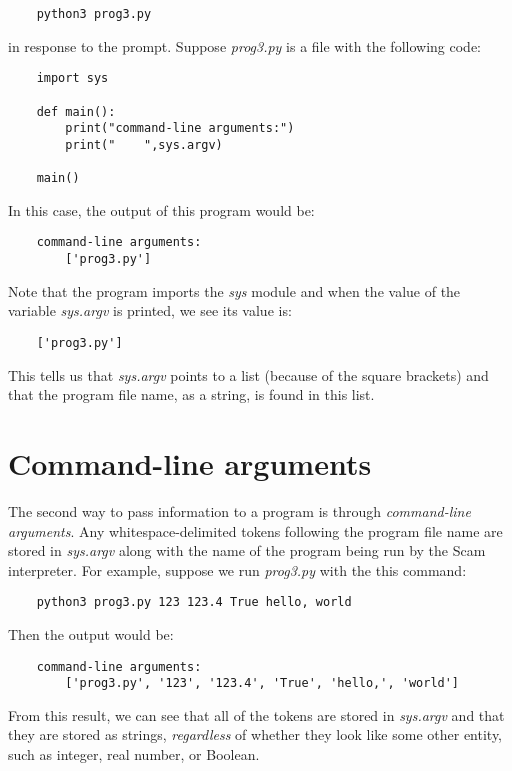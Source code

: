 \begin{verbatim}
    python3 prog3.py
\end{verbatim}

in response to the prompt. Suppose {\it prog3.py} is a file
with the following code:

\begin{verbatim}
    import sys

    def main():
        print("command-line arguments:")
        print("    ",sys.argv)

    main()
\end{verbatim}

In this case, the output of this program would be:

\begin{verbatim}
    command-line arguments:
        ['prog3.py']
\end{verbatim}

Note that the program imports the {\it sys} module and when
the value of the variable {\it sys.argv} is printed, we
see its value is:

\begin{verbatim}
    ['prog3.py']
\end{verbatim}

This tells us that {\it sys.argv} points to a list (because of the
square brackets) and that the program file name, as a string,
is found in this list.

\section*{Command-line arguments}

The second way to pass information to a program is
through {\it command-line arguments}.
Any whitespace-delimited tokens following
the program file name are stored in {\it sys.argv} 
along with the name of the program being run
by the Scam interpreter.
For example, suppose we run {\it prog3.py} with the this
command:

\begin{verbatim}
    python3 prog3.py 123 123.4 True hello, world
\end{verbatim}

Then the output would be:

\begin{verbatim}
    command-line arguments:
        ['prog3.py', '123', '123.4', 'True', 'hello,', 'world']
\end{verbatim}

From this result, we can see that all of the tokens are stored
in {\it sys.argv} and that they are stored as strings, {\it regardless} of
whether they look like some other entity, such as integer,
real number, or Boolean.

